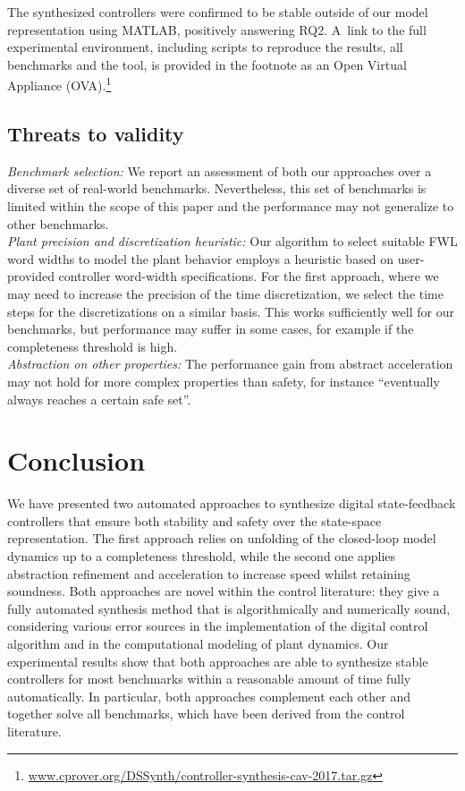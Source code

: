 \documentclass[runningheads,a4paper]{llncs}
\begin{document}
The synthesized controllers were confirmed to be stable outside of our model
representation using MATLAB, positively answering RQ2.  A~link to the full
experimental environment, including scripts to reproduce the results, all
benchmarks and the tool, is provided in the
footnote as an Open Virtual Appliance
(OVA).\footnote{\url{www.cprover.org/DSSynth/controller-synthesis-cav-2017.tar.gz}}


\subsection{Threats to validity}

\textit{Benchmark selection:} We report an assessment of both our approaches
over a diverse set of real-world benchmarks.  Nevertheless, this set of
benchmarks is limited within the scope of this paper and the performance may
not generalize to other benchmarks.\\
%
\textit{Plant precision and discretization heuristic:} Our algorithm to
select suitable FWL word widths to model the plant behavior employs a
heuristic based on user-provided controller word-width specifications.  For
the first approach, where we may need to increase the precision of the time
discretization, we select the time steps for the discretizations on a
similar basis.  This works sufficiently well for our benchmarks, but
performance may suffer in some cases, for example if the completeness
threshold is high.\\
%
\textit{Abstraction on other properties:} The performance gain from abstract
acceleration may not hold for more complex properties than safety, for
instance ``eventually always reaches a certain safe set''.

\section{Conclusion}

We have presented two automated approaches to synthesize digital
state-feedback controllers that ensure both stability and safety over the
state-space representation.  The first approach relies on unfolding of the
closed-loop model dynamics up to a completeness threshold, while the second
one applies abstraction refinement and acceleration to increase speed whilst
retaining soundness.
%
Both approaches are novel within the control literature: they give a fully
automated synthesis method that is algorithmically and numerically sound,
considering various error sources in the implementation of the digital
control algorithm and in the computational modeling of plant dynamics.
%
Our experimental results show that both approaches are able to synthesize
stable controllers for most benchmarks within a reasonable amount of time
fully automatically.  In particular, both approaches complement each other
and together solve all benchmarks, which have been derived from the control
literature.
\end{document}
